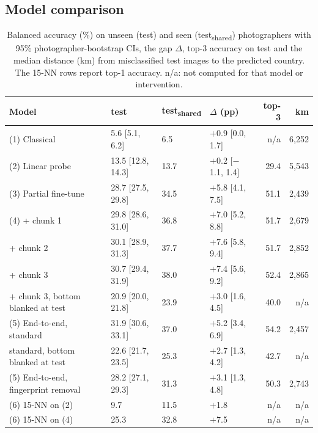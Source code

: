 \documentclass[11pt]{article}
\newcommand{\tsh}{test\textsubscript{shared}}
\begin{document}
\subsection{Model comparison}\label{sec:comparison}
\begin{table}[!htbp]
\centering\small
\caption{Balanced accuracy (\%) on unseen (test) and seen (\tsh) photographers with 95\%
photographer-bootstrap CIs, the gap $\Delta$, top-3 accuracy on test and the median distance (km) from
misclassified test images to the predicted country. The 15-NN rows report top-1 accuracy. n/a: not computed for that model or intervention.}
\label{tab:main}
\setlength{\tabcolsep}{4pt}
\begin{tabular}{@{}llllrr@{}}
\toprule
Model & test & \tsh & $\Delta$ (pp) & top-3 & km \\
\midrule
(1) Classical & 5.6 [5.1, 6.2] & 6.5 & $+$0.9 [0.0, 1.7] & n/a & 6{,}252 \\
(2) Linear probe & 13.5 [12.8, 14.3] & 13.7 & $+$0.2 [$-$1.1, 1.4] & 29.4 & 5{,}543 \\
(3) Partial fine-tune & 28.7 [27.5, 29.8] & 34.5 & $+$5.8 [4.1, 7.5] & 51.1 & 2{,}439 \\
(4) + chunk 1 & 29.8 [28.6, 31.0] & 36.8 & $+$7.0 [5.2, 8.8] & 51.7 & 2{,}679 \\
\phantom{(4)} + chunk 2 & 30.1 [28.9, 31.3] & 37.7 & $+$7.6 [5.8, 9.4] & 51.7 & 2{,}852 \\
\phantom{(4)} + chunk 3 & 30.7 [29.4, 31.9] & 38.0 & $+$7.4 [5.6, 9.2] & 52.4 & 2{,}865 \\
\phantom{(4)} + chunk 3, bottom blanked at test & 20.9 [20.0, 21.8] & 23.9 & $+$3.0 [1.6, 4.5] & 40.0 & n/a \\
\midrule
(5) End-to-end, standard & 31.9 [30.6, 33.1] & 37.0 & $+$5.2 [3.4, 6.9] & 54.2 & 2{,}457 \\
\phantom{(5)} standard, bottom blanked at test & 22.6 [21.7, 23.5] & 25.3 & $+$2.7 [1.3, 4.2] & 42.7 & n/a \\
(5) End-to-end, fingerprint removal & 28.2 [27.1, 29.3] & 31.3 & $+$3.1 [1.3, 4.8] & 50.3 & 2{,}743 \\
\midrule
(6) 15-NN on (2) & 9.7 & 11.5 & $+$1.8 & n/a & n/a \\
(6) 15-NN on (4) & 25.3 & 32.8 & $+$7.5 & n/a & n/a \\
\bottomrule
\end{tabular}
\end{table}
\end{document}
